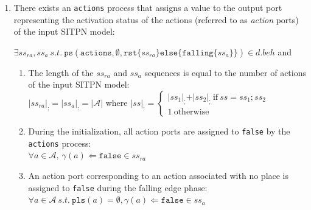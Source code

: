\begin{definition}
\begin{enumerate}[resume]
  \item\label{it:actions} There exists an \texttt{actions} process
    that assigns a value to the output port representing the
    activation status of the actions (referred to as \textit{action}
    ports) of the input SITPN model:
    
    $\exists{}ss_{ra},ss_{a}~s.t.~\mathtt{ps}(\mathtt{actions},\emptyset,\mathtt{rst}\{ss_{ra}\}\mathtt{else}\{\mathtt{falling}\{ss_a\}\})\in{}d.beh$
    and
    \begin{enumerate}
    \item The length of the $ss_{ra}$ and $ss_{a}$ sequences is equal
      to the number of actions of the input SITPN model:\\
      $\vert{}ss_{ra}\vert_{;}=\vert{}ss_a\vert_{;}=\vert\mathcal{A}\vert$ where $\vert{}ss\vert{}_{;}=
      \begin{cases}
        \vert{}ss_1\vert_{;}+\vert{}ss_2\vert_{;}~\mathrm{if}~ss=ss_1;ss_2 \\
        1~\mathrm{otherwise}
      \end{cases}
      $
    \item During the initialization, all action ports are assigned to
      \texttt{false} by the \texttt{actions} process:\\
      $\forall{}a\in\mathcal{A},~\gamma(a)\Leftarrow\mathtt{false}\in{}ss_{ra}$
    \item An action port corresponding to an action associated with no
      place is assigned to \texttt{false} during the falling edge
      phase:\\
      $\forall{}a\in\mathcal{A}~s.t.~\mathtt{pls}(a)=\emptyset,\gamma(a)\Leftarrow\mathtt{false}\in{}ss_{a}$
      

\end{enumerate}
\end{enumerate}
\end{definition}
